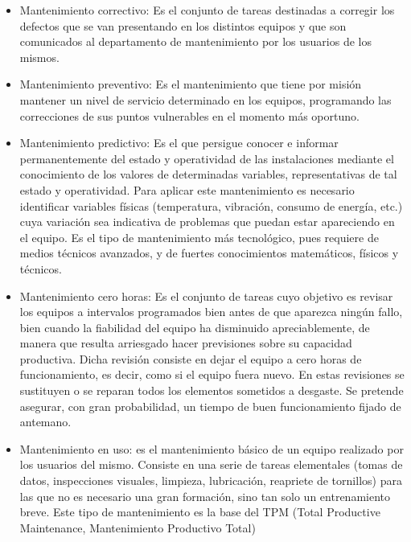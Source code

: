 \begin{itemize}
\item Mantenimiento correctivo: Es el conjunto de tareas destinadas a corregir los defectos que se van presentando en los distintos equipos y
que son comunicados al departamento de mantenimiento por los
usuarios de los mismos.
\item Mantenimiento preventivo: Es el mantenimiento que tiene por misión
mantener un nivel de servicio determinado en los equipos, programando las correcciones de sus puntos vulnerables en el momento
más oportuno.
\item Mantenimiento predictivo: Es el que persigue conocer e informar permanentemente del estado y operatividad de las instalaciones mediante
el conocimiento de los valores de determinadas variables, representativas de tal estado y operatividad. Para aplicar este mantenimiento es
necesario identificar variables físicas (temperatura, vibración, consumo
de energía, etc.) cuya variación sea indicativa de problemas que puedan
estar apareciendo en el equipo. Es el tipo de mantenimiento más tecnológico, pues requiere de medios técnicos avanzados, y de fuertes conocimientos matemáticos, físicos y técnicos.
\item Mantenimiento cero horas: Es el conjunto de tareas cuyo objetivo es revisar los equipos a intervalos programados bien antes de que aparezca
ningún fallo, bien cuando la fiabilidad del equipo ha disminuido apreciablemente, de manera que resulta arriesgado hacer previsiones sobre
su capacidad productiva. Dicha revisión consiste en dejar el equipo a
cero horas de funcionamiento, es decir, como si el equipo fuera nuevo.
En estas revisiones se sustituyen o se reparan todos los elementos sometidos a desgaste. Se pretende asegurar, con gran probabilidad, un
tiempo de buen funcionamiento fijado de antemano.
\item Mantenimiento en uso: es el mantenimiento básico de un equipo realizado por los usuarios del mismo. Consiste en una serie de tareas elementales (tomas de datos, inspecciones visuales, limpieza, lubricación, reapriete de tornillos) para las que no es necesario una gran
formación, sino tan solo un entrenamiento breve. Este tipo de mantenimiento es la base del TPM (Total Productive Maintenance, Mantenimiento Productivo Total)
\end{itemize}

